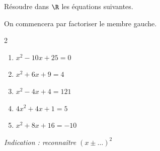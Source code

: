 \begin{exo}
	Résoudre dans $\R$ les équations suivantes.

	On commencera par factoriser le membre gauche.

	\vspace*{-2mm}\begin{multicols}{2}
		\begin{enumerate}[label=\alph*),itemsep=2mm]
			\item $x^2 - 10x + 25 = 0$
			\item $x^2 + 6x + 9 = 4$
			\item $x^2 - 4x + 4 = 121$
			\item $4x^2 + 4x + 1 = 5$
			\item $x^2 + 8x + 16 = -10$
		\end{enumerate}
	\end{multicols}

	\textit{Indication : reconnaître $(x \pm \ldots)^2$}
\end{exo}
